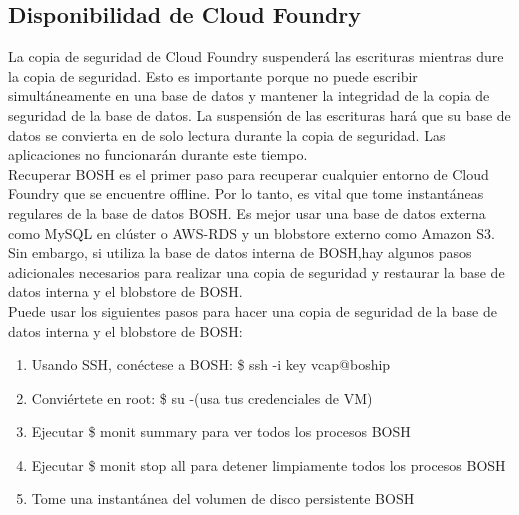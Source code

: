 \documentclass[a4paper,11pt]{article}
\begin{document}
\subsection{Disponibilidad de Cloud Foundry}
La copia de seguridad de Cloud Foundry suspenderá las escrituras mientras dure la copia de seguridad. Esto es importante porque no puede escribir simultáneamente en una base de datos y mantener la integridad de la copia de seguridad de la base de datos. La suspensión de las escrituras hará que su base de datos se convierta en de solo lectura durante la copia de seguridad. Las aplicaciones no funcionarán durante este tiempo.\\
Recuperar BOSH es el primer paso para recuperar cualquier entorno de Cloud Foundry que se encuentre offline. Por lo tanto, es vital que tome instantáneas regulares de la base de datos BOSH. Es mejor usar una base de datos externa como MySQL en clúster o AWS-RDS y un
blobstore externo como Amazon S3. Sin embargo, si utiliza la base de datos interna de BOSH,hay algunos pasos adicionales necesarios para realizar una copia de seguridad y restaurar la base de datos interna y el blobstore de BOSH.\\
Puede usar los siguientes pasos para hacer una copia de seguridad de la base de datos interna y el blobstore de BOSH:

\begin{enumerate}
  \item Usando SSH, conéctese a BOSH: \$ ssh -i key vcap@boship
  \item Conviértete en root: \$ su -(usa tus credenciales de VM)
  \item Ejecutar \$ monit summary para ver todos los procesos BOSH
  \item Ejecutar \$ monit stop all para detener limpiamente todos los procesos BOSH
  \item Tome una instantánea del volumen de disco persistente BOSH
\end{enumerate}
\end{document}
